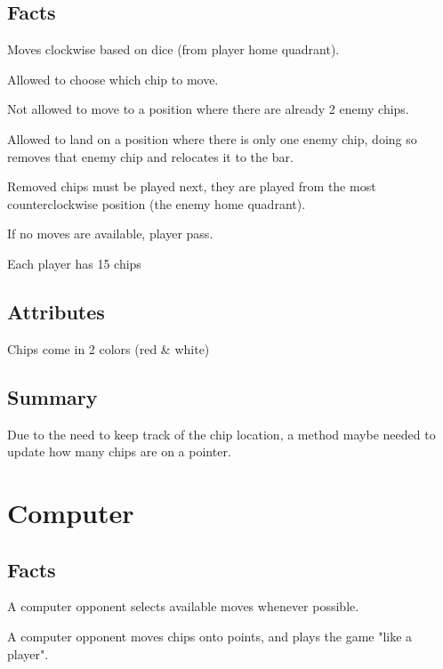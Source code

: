 \documentclass{report}
\begin{document}
\subsection{Facts}
\begin{dashed}
    \item Moves clockwise based on dice (from player home quadrant).
    \item Allowed to choose which chip to move.
    \item Not allowed to move to a position where there are already 2 enemy chips.
    \item Allowed to land on a position where there is only one enemy chip, doing so
      removes that enemy chip and relocates it to the bar.
    \item Removed chips must be played next, they are played from the most
      counterclockwise position (the enemy home quadrant).
    \item If no moves are available, player pass.
    \item Each player has 15 chips
\end{dashed}

\subsection{Attributes}

\begin{dashed}
    \item Chips come in 2 colors (red \& white)
\end{dashed}

\subsection{Summary}
Due to the need to keep track of the chip location, a method maybe needed to update how many chips
are on a pointer.

\section{Computer}

\subsection{Facts}

\begin{dashed}
    \item A computer opponent selects available moves whenever possible.
    \item A computer opponent moves chips onto points, and plays
        the game "like a player".
\end{dashed}
\end{document}
